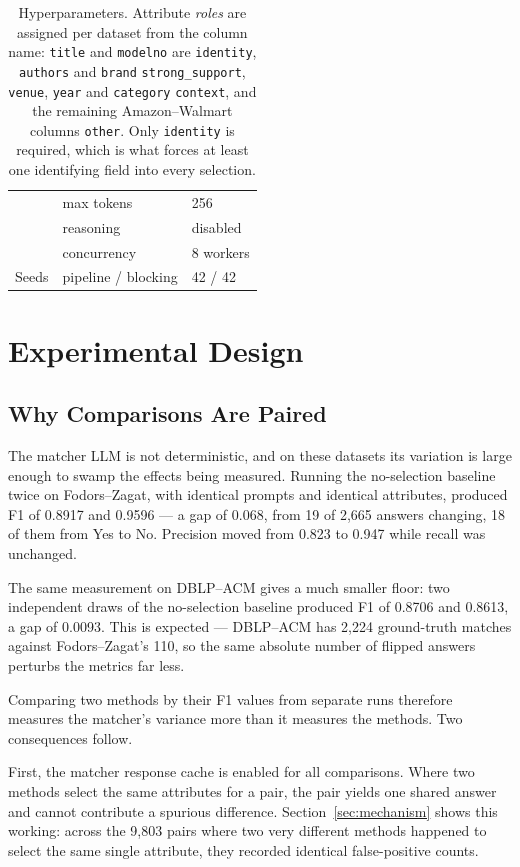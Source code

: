 \documentclass[11pt]{article}
\begin{document}
\begin{table}[h]
\begin{tabular}{lll}
            & max tokens                  & 256 \\
            & reasoning                   & disabled \\
            & concurrency                 & 8 workers \\
\midrule
Seeds       & pipeline / blocking         & 42 / 42 \\
\bottomrule
\end{tabular}
\caption{Hyperparameters. Attribute \emph{roles} are assigned per dataset from the column
name: \texttt{title} and \texttt{modelno} are \texttt{identity}, \texttt{authors} and
\texttt{brand} \texttt{strong\_support}, \texttt{venue}, \texttt{year} and
\texttt{category} \texttt{context}, and the remaining Amazon--Walmart columns
\texttt{other}. Only \texttt{identity} is required, which is what forces at least one
identifying field into every selection.}
\end{table}

\section{Experimental Design}
\label{sec:design}

\subsection{Why Comparisons Are Paired}
\label{sec:paired}

The matcher LLM is not deterministic, and on these datasets its variation is large enough to
swamp the effects being measured. Running the no-selection baseline twice on Fodors--Zagat,
with identical prompts and identical attributes, produced F1 of 0.8917 and 0.9596 --- a gap
of 0.068, from 19 of 2{,}665 answers changing, 18 of them from Yes to No. Precision moved
from 0.823 to 0.947 while recall was unchanged.

The same measurement on DBLP--ACM gives a much smaller floor: two independent draws of the
no-selection baseline produced F1 of 0.8706 and 0.8613, a gap of 0.0093. This is expected ---
DBLP--ACM has 2{,}224 ground-truth matches against Fodors--Zagat's 110, so the same absolute
number of flipped answers perturbs the metrics far less.

Comparing two methods by their F1 values from separate runs therefore measures the matcher's
variance more than it measures the methods. Two consequences follow.

First, the matcher response cache is enabled for all comparisons. Where two methods select
the same attributes for a pair, the pair yields one shared answer and cannot contribute a
spurious difference. Section~\ref{sec:mechanism} shows this working: across the 9{,}803 pairs
where two very different methods happened to select the same single attribute, they recorded
identical false-positive counts.
\end{document}
